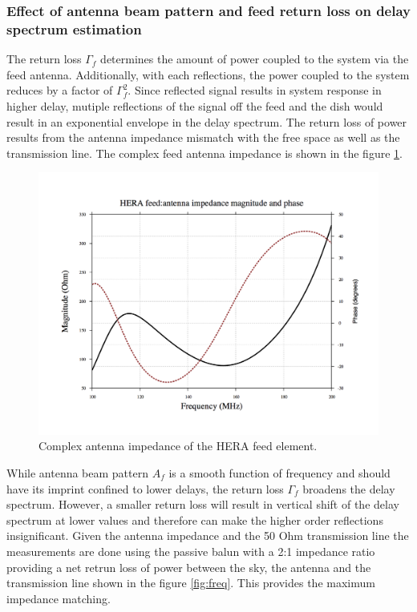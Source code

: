 \documentclass[twocolumn]{emulateapj}
\begin{document}
\subsubsection{Effect of antenna beam pattern and feed return loss on delay spectrum estimation}
The return loss $\Gamma_{f}$ determines the amount of power coupled to the system via the feed antenna. Additionally, with each reflections, the power coupled to the system reduces by a factor of $\Gamma_{f}^{2}$. Since reflected signal results in system response in higher delay, mutiple reflections of the signal off the feed and the dish would result in an exponential envelope in the delay spectrum.  The return loss of power results from the antenna impedance mismatch with the free space as well as the transmission line. The complex feed antenna impedance is shown in the figure \ref{fig:feed_impedance}.
\begin{figure}
\centering
\includegraphics[width=\linewidth]{plots/Feed_impedance.png}
\caption{Complex antenna impedance of the HERA feed element.}
\label{fig:feed_impedance}
\end{figure} 
While antenna beam pattern $A_{f}$ is a smooth function of frequency and should have its imprint confined to lower delays, the return loss $\Gamma_{f}$ broadens the delay spectrum. However, a smaller return loss will result in vertical shift of the delay spectrum at lower values and therefore can make the higher order reflections insignificant. Given the antenna impedance and the 50 Ohm transmission line the measurements are done using the passive balun with a 2:1 impedance ratio providing a net retrun loss of power between the sky, the antenna and the transmission line shown in the figure \ref{fig:freq}. This provides the maximum impedance matching. \\
\end{document}
